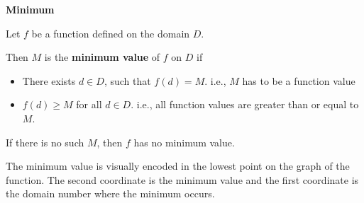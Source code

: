 \documentclass{ximera}
\begin{document}
\begin{definition} \textbf{\textcolor{green!50!black}{Minimum}} 


Let $f$ be a function defined on the domain $D$.

Then $M$ is the \textbf{minimum value} of $f$ on $D$ if    


\begin{itemize}
\item There exists $d \in D$, such that $f(d) = M$.   i.e., $M$ has to be a function value \\

\item $f(d) \geq M$ for all $d \in D$. i.e., all function values are greater than or equal to $M$. 

\end{itemize}


If there is no such $M$, then $f$ has no minimum value.

\end{definition}



\begin{observation}
The minimum value is visually encoded in the lowest point on the graph of the function.  The second coordinate is the minimum value and the first coordinate is the domain number where the minimum occurs.
\end{observation}
\end{document}
